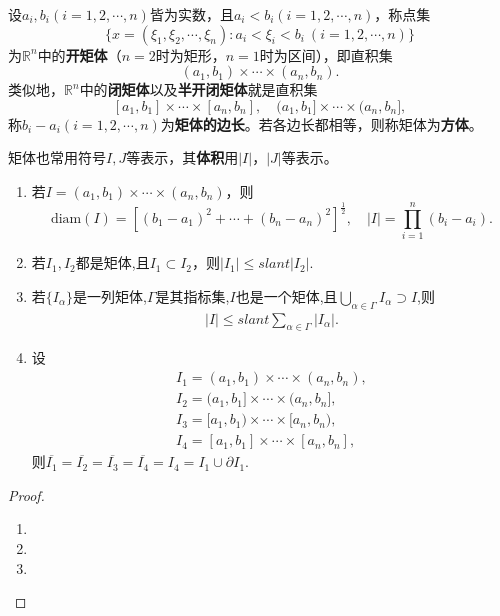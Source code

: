 \documentclass[../../main.tex]{subfiles}
\begin{document}
\begin{definition}[矩体]
设\(a_i,b_i(i = 1,2,\cdots,n)\)皆为实数，且\(a_i < b_i(i = 1,2,\cdots,n)\)，称点集
\[\{x = (\xi_1,\xi_2,\cdots,\xi_n):a_i<\xi_i < b_i\ (i = 1,2,\cdots,n)\}\]
为\(\mathbb{R}^n\)中的\textbf{开矩体}（\(n = 2\)时为矩形，\(n = 1\)时为区间），即直积集
\[(a_1,b_1)\times\cdots\times(a_n,b_n).\]
类似地，\(\mathbb{R}^n\)中的\textbf{闭矩体}以及\textbf{半开闭矩体}就是直积集
\[[a_1,b_1]\times\cdots\times[a_n,b_n],\quad(a_1,b_1]\times\cdots\times(a_n,b_n],\]
称\(b_i - a_i(i = 1,2,\cdots,n)\)为\textbf{矩体的边长}。若各边长都相等，则称矩体为\textbf{方体}。

矩体也常用符号\(I,J\)等表示，其\textbf{体积}用\(|I|\)，\(|J|\)等表示。
\end{definition}

\begin{proposition}[矩体的性质]\label{proposition:矩体的性质}
\begin{enumerate}[(1)]
\item 若\(I=(a_1,b_1)\times\cdots\times(a_n,b_n)\)，则
\[\text{diam}(I)=[(b_1 - a_1)^2+\cdots+(b_n - a_n)^2]^{\frac{1}{2}},\quad |I|=\prod_{i = 1}^{n}(b_i - a_i).\]

\item 若\(I_1,I_2\)都是矩体,且$I_1\subset I_2$，则$|I_1|\leqslant slant |I_2|$.

\item 若$\{I_\alpha\}$是一列矩体,$\Gamma$是其指标集,$I$也是一个矩体,且$\bigcup_{\alpha\in \Gamma}I_\alpha \supset I$,则
\begin{align*}
|I|\leqslant slant \sum_{\alpha\in \Gamma}|I_\alpha|.
\end{align*}

\item 设
\begin{gather*}
I_1=(a_1,b_1)\times \cdots \times (a_n,b_n),
\\
I_2=(a_1,b_1]\times \cdots \times (a_n,b_n],
\\
I_3=[a_1,b_1)\times \cdots \times [a_n,b_n),
\\
I_4=[a_1,b_1]\times \cdots \times [a_n,b_n],
\end{gather*}
则$\overline{I_1}=\overline{I_2}=\overline{I_3}=\overline{I_4}=I_4=I_1\cup \partial I_1$.
\end{enumerate}
\end{proposition}
\begin{proof}
\begin{enumerate}[(1)]
\item 

\item 

\item 
\end{enumerate}
\end{proof}
\end{document}

